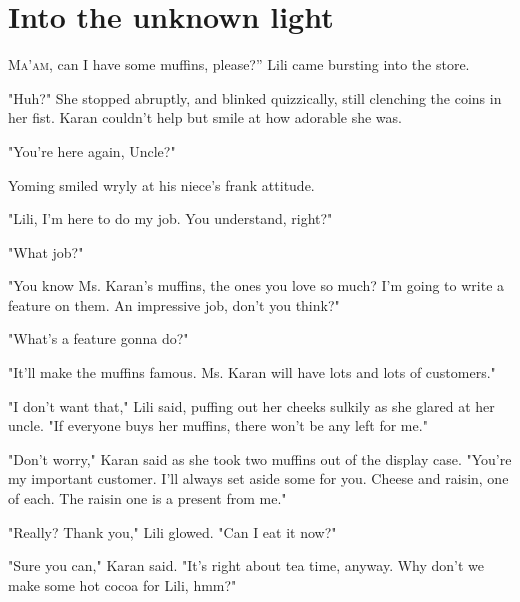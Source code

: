 
\chapter{Into the unknown light}


\lettrine[ante=``]{M}{a'am}, can I have some muffins, please?'' Lili came bursting into the
store.

"Huh?" She stopped abruptly, and blinked quizzically, still clenching
the coins in her fist. Karan couldn't help but smile at how adorable she
was.

"You're here again, Uncle?"

Yoming smiled wryly at his niece's frank attitude.

"Lili, I'm here to do my job. You understand, right?"

"What job?"

"You know Ms. Karan's muffins, the ones you love so much? I'm going to
write a feature on them. An impressive job, don't you think?"

"What's a feature gonna do?"

"It'll make the muffins famous. Ms. Karan will have lots and lots of
customers."

"I don't want that," Lili said, puffing out her cheeks sulkily as she
glared at her uncle. "If everyone buys her muffins, there won't be any
left for me."

"Don't worry," Karan said as she took two muffins out of the display
case. "You're my important customer. I'll always set aside some for you.
Cheese and raisin, one of each. The raisin one is a present from me."

"Really? Thank you," Lili glowed. "Can I eat it now?"

"Sure you can," Karan said. "It's right about tea time, anyway. Why
don't we make some hot cocoa for Lili, hmm?"

